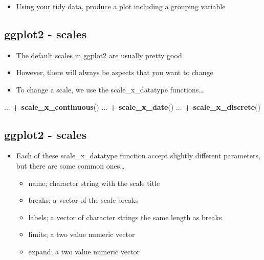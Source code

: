 \documentclass[]{article}
\newenvironment{Shaded}{\begin{snugshade}}{\end{snugshade}}
\newcommand{\KeywordTok}[1]{\textcolor[rgb]{0.13,0.29,0.53}{\textbf{#1}}}
\newcommand{\StringTok}[1]{\textcolor[rgb]{0.31,0.60,0.02}{#1}}
\newcommand{\OperatorTok}[1]{\textcolor[rgb]{0.81,0.36,0.00}{\textbf{#1}}}
\newcommand{\NormalTok}[1]{#1}
\providecommand{\tightlist}{%
  \setlength{\itemsep}{0pt}\setlength{\parskip}{0pt}}
\begin{document}
\begin{itemize}
\tightlist
\item
  Using your tidy data, produce a plot including a grouping variable
\end{itemize}

\subsection{ggplot2 - scales}\label{ggplot2---scales}

\begin{itemize}
\tightlist
\item
  The default scales in ggplot2 are usually pretty good
\item
  However, there will always be aspects that you want to change
\item
  To change a scale, we use the scale\_x\_datatype functions\ldots{}
\end{itemize}

\begin{Shaded}
\begin{Highlighting}[]
\NormalTok{... }\OperatorTok{+}\StringTok{ }\KeywordTok{scale_x_continuous}\NormalTok{()}
\NormalTok{... }\OperatorTok{+}\StringTok{ }\KeywordTok{scale_x_date}\NormalTok{()}
\NormalTok{... }\OperatorTok{+}\StringTok{ }\KeywordTok{scale_x_discrete}\NormalTok{()}
\end{Highlighting}
\end{Shaded}

\subsection{ggplot2 - scales}\label{ggplot2---scales-1}

\begin{itemize}
\tightlist
\item
  Each of these scale\_x\_datatype function accept slightly different
  parameters, but there are some common ones\ldots{}

  \begin{itemize}
  \tightlist
  \item
    name; character string with the scale title
  \item
    breaks; a vector of the scale breaks
  \item
    labels; a vector of character strings the same length as breaks
  \item
    limits; a two value numeric vector
  \item
    expand; a two value numeric vector
  \end{itemize}
\end{itemize}
\end{document}
